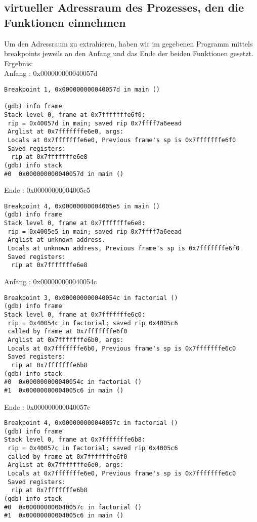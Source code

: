 
\subsection{virtueller Adressraum des Prozesses, den die Funktionen einnehmen}

Um den Adressraum zu extrahieren, haben wir im gegebenen Programm mittels  breakpoints jeweils an den Anfang und das Ende der beiden Funktionen gesetzt.\\
Ergebnis:\\

Anfang : 0x000000000040057d
\begin{lstlisting}[numbers=none]
Breakpoint 1, 0x000000000040057d in main ()

(gdb) info frame
Stack level 0, frame at 0x7fffffffe6f0:
 rip = 0x40057d in main; saved rip 0x7ffff7a6eead
 Arglist at 0x7fffffffe6e0, args:
 Locals at 0x7fffffffe6e0, Previous frame's sp is 0x7fffffffe6f0
 Saved registers:
  rip at 0x7fffffffe6e8
(gdb) info stack
#0  0x000000000040057d in main ()
\end{lstlisting}

Ende : 0x00000000004005e5
\begin{lstlisting}[numbers=none]
Breakpoint 4, 0x00000000004005e5 in main ()
(gdb) info frame
Stack level 0, frame at 0x7fffffffe6e8:
 rip = 0x4005e5 in main; saved rip 0x7ffff7a6eead
 Arglist at unknown address.
 Locals at unknown address, Previous frame's sp is 0x7fffffffe6f0
 Saved registers:
  rip at 0x7fffffffe6e8

\end{lstlisting}

\clearpage

Anfang : 0x000000000040054c
\begin{lstlisting}[numbers=none]
Breakpoint 3, 0x000000000040054c in factorial ()
(gdb) info frame
Stack level 0, frame at 0x7fffffffe6c0:
 rip = 0x40054c in factorial; saved rip 0x4005c6
 called by frame at 0x7fffffffe6f0
 Arglist at 0x7fffffffe6b0, args:
 Locals at 0x7fffffffe6b0, Previous frame's sp is 0x7fffffffe6c0
 Saved registers:
  rip at 0x7fffffffe6b8
(gdb) info stack
#0  0x000000000040054c in factorial ()
#1  0x00000000004005c6 in main ()
\end{lstlisting}

Ende : 0x000000000040057c
\begin{lstlisting}[numbers=none]
Breakpoint 4, 0x000000000040057c in factorial ()
(gdb) info frame
Stack level 0, frame at 0x7fffffffe6b8:
 rip = 0x40057c in factorial; saved rip 0x4005c6
 called by frame at 0x7fffffffe6f0
 Arglist at 0x7fffffffe6e0, args:
 Locals at 0x7fffffffe6e0, Previous frame's sp is 0x7fffffffe6c0
 Saved registers:
  rip at 0x7fffffffe6b8
(gdb) info stack
#0  0x000000000040057c in factorial ()
#1  0x00000000004005c6 in main ()
\end{lstlisting}

